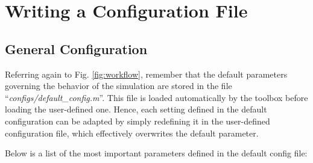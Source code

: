 \chapter{Writing a Configuration File}
\label{chap:configfile}

\section{General Configuration}
\label{sec:generalconfig}

Referring again to Fig. \ref{fig:workflow}, remember that the default parameters governing the behavior of the simulation are stored in the file ``\textit{configs/default\_config.m}''. This file is loaded automatically by the toolbox before loading the user-defined one. Hence, each setting defined in the default configuration can be adapted by simply redefining it in the user-defined configuration file, which effectively overwrites the default parameter.

Below is a list of the most important parameters defined in the default config file:

